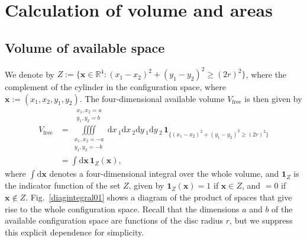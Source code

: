 \documentclass[superscriptaddress,pre,reprint,showpacs,twocolumn]{revtex4-1}
\newcommand{\rd}[1]{\mathrm{d}{#1} \,}
\newcommand{\indicatorsymbol}{\mathbf{1}}
\newcommand{\indicator}[1]{\indicatorsymbol_{ \{   #1 \} } }
\begin{document}
\section{Calculation of volume and areas}


\subsection{Volume of available space}

We denote by $Z := \{ \mathbf{x} \in \mathbb{R}^4: (x_1-x_2)^2 + (y_1-y_2)^2 \ge (2r)^2 \}$, where
the complement of the cylinder in the configuration space, where $\mathbf{x} := (x_1, x_2, y_1, y_2)$.
The four-dimensional available volume $V_\text{free}$ is then given by
\begin{align}\label{volindic}
V_\text{free} &= 
\iiiint
\limits_{\substack{x_1, x_2 = -a \\ y_1, y_2 = -b}}^{\substack{x_1, x_2 = a \\ y_1, y_2 = b}}
\rd x_1 \rd x_2 \rd y_1 \rd y_2 
\, \indicator{ (x_1-x_2)^2 + (y_1-y_2)^2 \ge (2r)^2 } \\
&=
\int  \mathrm{d} \mathbf{x} \, \indicatorsymbol_Z(\mathbf{x}), 
\end{align}
where $\int  \mathrm{d} \mathbf{x}$
denotes a four-dimensional integral over the whole volume, and 
$\indicatorsymbol_Z$ is the indicator function of the set $Z$, 
given by $\indicatorsymbol_Z (\mathbf{x}) = 1$ if $\mathbf{x} \in Z$, and $=0$ if $\mathbf{x} \notin Z$.
Fig.~\ref{diagintegral01} shows a diagram of the product of
spaces that give rise to the whole configuration space.
Recall that the dimensions $a$ and $b$ of the available configuration space are functions of the disc radius $r$, 
but we suppress this explicit dependence for simplicity.
\end{document}
